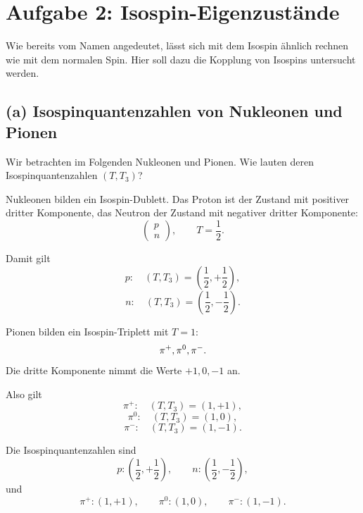 \documentclass[11pt,a4paper]{scrartcl}
\begin{document}
\section{Aufgabe 2: Isospin-Eigenzustände}

Wie bereits vom Namen angedeutet, lässt sich mit dem Isospin ähnlich rechnen wie mit dem normalen Spin. Hier soll dazu die Kopplung von Isospins untersucht werden.

\subsection*{(a) Isospinquantenzahlen von Nukleonen und Pionen}

Wir betrachten im Folgenden Nukleonen und Pionen. Wie lauten deren Isospinquantenzahlen $(T,T_3)$?

\begin{calculationbox}
Nukleonen bilden ein Isospin-Dublett. Das Proton ist der Zustand mit positiver dritter Komponente, das Neutron der Zustand mit negativer dritter Komponente:
\[
\begin{pmatrix}p\\ n\end{pmatrix},
\qquad
T=\frac12.
\]

\begin{calculationbox}
Damit gilt
\[
p:\quad \left(T,T_3\right)=\left(\frac12,+\frac12\right),
\]
\[
n:\quad \left(T,T_3\right)=\left(\frac12,-\frac12\right).
\]
\end{calculationbox}

Pionen bilden ein Isospin-Triplett mit $T=1$:
\[
\pi^+,\\ \pi^0,\\ \pi^-.
\]
Die dritte Komponente nimmt die Werte $+1,0,-1$ an.

\begin{calculationbox}
Also gilt
\[
\pi^+:\quad (T,T_3)=(1,+1),
\]
\[
\pi^0:\quad (T,T_3)=(1,0),
\]
\[
\pi^-:\quad (T,T_3)=(1,-1).
\]
\end{calculationbox}
\end{calculationbox}

\begin{answerbox}
Die Isospinquantenzahlen sind
\[
\boxed{p:\left(\frac12,+\frac12\right)},
\qquad
\boxed{n:\left(\frac12,-\frac12\right)},
\]
und
\[
\boxed{\pi^+:(1,+1)},
\qquad
\boxed{\pi^0:(1,0)},
\qquad
\boxed{\pi^-:(1,-1)}.
\]
\end{answerbox}
\end{document}
